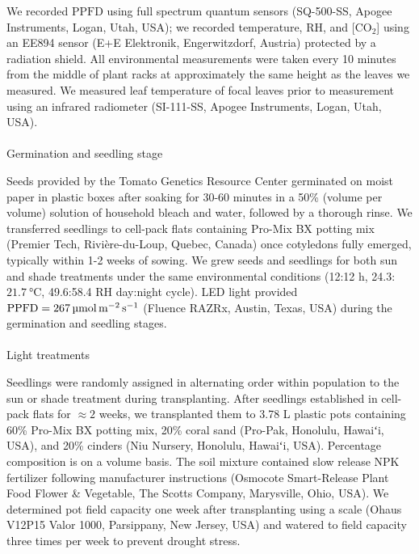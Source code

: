 \documentclass[
  letterpaper,
  DIV=11,
  numbers=noendperiod]{scrartcl}
\makeatletter
\let\oldparagraph\paragraph
\renewcommand{\paragraph}{
    \@ifstar
      \xxxParagraphStar
      \xxxParagraphNoStar
  }
\newcommand{\xxxParagraphStar}[1]{\oldparagraph*{#1}\mbox{}}
\newcommand{\xxxParagraphNoStar}[1]{\oldparagraph{#1}\mbox{}}
\makeatother
\begin{document}
We recorded \(\mathrm{PPFD}\) using full spectrum quantum sensors
(SQ-500-SS, Apogee Instruments, Logan, Utah, USA); we recorded
temperature, RH, and {[}CO\(_2\){]} using an EE894 sensor (E+E
Elektronik, Engerwitzdorf, Austria) protected by a radiation shield. All
environmental measurements were taken every 10 minutes from the middle
of plant racks at approximately the same height as the leaves we
measured. We measured leaf temperature of focal leaves prior to
measurement using an infrared radiometer (SI-111-SS, Apogee Instruments,
Logan, Utah, USA).

\paragraph{Germination and seedling
stage}\label{germination-and-seedling-stage}

Seeds provided by the Tomato Genetics Resource Center germinated on
moist paper in plastic boxes after soaking for 30-60 minutes in a 50\%
(volume per volume) solution of household bleach and water, followed by
a thorough rinse. We transferred seedlings to cell-pack flats containing
Pro-Mix BX potting mix (Premier Tech, Rivière-du-Loup, Quebec, Canada)
once cotyledons fully emerged, typically within 1-2 weeks of sowing. We
grew seeds and seedlings for both sun and shade treatments under the
same environmental conditions (12:12 h,
24.3:\(\qty{21.7}{\degreeCelsius}\), 49.6:58.4 RH day:night cycle). LED
light provided
\(\mathrm{PPFD} = \qty{267}{\micro\mol\raiseto{-2}\meter\raiseto{-1}\second}\)
(Fluence RAZRx, Austin, Texas, USA) during the germination and seedling
stages.

\paragraph{Light treatments}\label{light-treatments}

Seedlings were randomly assigned in alternating order within population
to the sun or shade treatment during transplanting. After seedlings
established in cell-pack flats for \(\approx 2\) weeks, we transplanted
them to 3.78 L plastic pots containing 60\% Pro-Mix BX potting mix, 20\%
coral sand (Pro-Pak, Honolulu, Hawaiʻi, USA), and 20\% cinders (Niu
Nursery, Honolulu, Hawaiʻi, USA). Percentage composition is on a volume
basis. The soil mixture contained slow release NPK fertilizer following
manufacturer instructions (Osmocote Smart-Release Plant Food Flower \&
Vegetable, The Scotts Company, Marysville, Ohio, USA). We determined pot
field capacity one week after transplanting using a scale (Ohaus V12P15
Valor 1000, Parsippany, New Jersey, USA) and watered to field capacity
three times per week to prevent drought stress.
\end{document}
